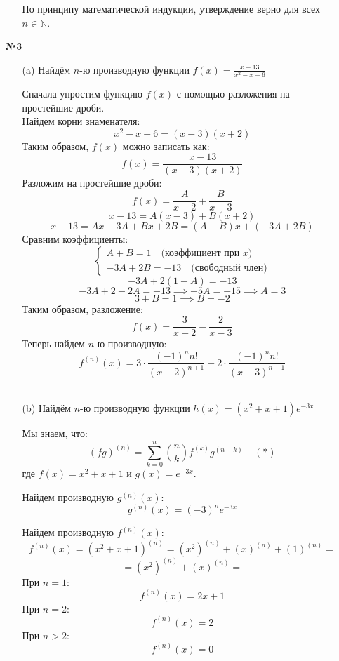\documentclass[a4paper]{article}
\newcommand{\case}[1]{\begin{cases} #1 \end{cases}}
\begin{document}
\begin{enumerate}
\begin{enumerate}
    По принципу математической индукции, утверждение верно для всех $n \in \mathbb{N}$. \\
    \end{enumerate}


    \item[\textbf{№3}]
    \begin{enumerate}
        \item[(a)]Найдём $ n $-ю производную функции $ f(x) = \frac{x-13}{x^{2}-x-6} $

        Сначала упростим функцию $ f(x) $ с помощью разложения на простейшие дроби. 
        \\Найдем корни знаменателя:
        $$
        x^2 - x - 6 = (x - 3)(x + 2)
        $$
        Таким образом, $ f(x) $ можно записать как:
        $$
        f(x) = \frac{x - 13}{(x - 3)(x + 2)}
        $$
        Разложим на простейшие дроби:
        $$
        f(x) = \frac{A}{x + 2} + \frac{B}{x - 3}
        $$
        $$
        x - 13 = A(x - 3) + B(x + 2)
        $$
        $$
        x - 13 = Ax - 3A + Bx + 2B = (A + B)x + (-3A + 2B)
        $$
        Сравним коэффициенты:
        $$
        \case{
        A + B = 1 \quad \text{(коэффициент при } x\text{)}\\
        -3A + 2B = -13 \quad \text{(свободный член)}
        }
        $$
        $$
        -3A + 2(1 - A) = -13
        $$
        $$
        -3A + 2 - 2A = -13 \implies -5A = -15 \implies A = 3
        $$
        $$
        3 + B = 1 \implies B = -2
        $$
        Таким образом, разложение:
        $$
        f(x) = \frac{3}{x + 2} - \frac{2}{x - 3}
        $$
        Теперь найдем $ n $-ю производную:
        $$
        f^{(n)}(x) = 3 \cdot \frac{(-1)^n n!}{(x + 2)^{n + 1}} - 2 \cdot \frac{(-1)^n n!}{(x - 3)^{n + 1}}
        $$\\

        \item[(b)]Найдём $ n $-ю производную функции $ h(x) = (x^2 + x + 1)e^{-3x} $

        Мы знаем, что:
        $$
        (fg)^{(n)} = \sum_{k=0}^{n} \binom{n}{k} f^{(k)} g^{(n-k)}\;\;\;\; (*)
        $$
        где $ f(x) = x^2 + x + 1 $ и $ g(x) = e^{-3x} $.

        Найдем производную $ g^{(n)}(x) $:
        $$
        g^{(n)}(x) = (-3)^n e^{-3x}
        $$

        Найдем производную $ f^{(n)}(x) $:\\
        $$f^{(n)}(x) = (x^2 + x + 1 )^{(n)} = (x^2)^{(n)} + (x)^{(n)} + (1)^{(n)} = $$
        $$= (x^2)^{(n)} + (x)^{(n)}=$$
        При $n=1$:
        $$f^{(n)}(x)=2x + 1$$
        При $n=2$:
        $$f^{(n)}(x)=2$$
        При $n>2$:
        $$f^{(n)}(x) = 0$$


\end{enumerate}
\end{enumerate}
\end{document}
